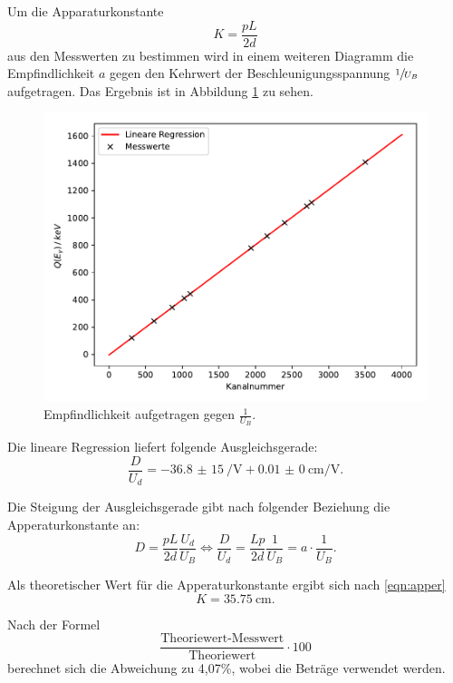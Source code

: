 Um die Apparaturkonstante
\begin{equation}
  K=\frac{pL}{2d}
  \label{eqn:apper}
\end{equation}
aus den Messwerten zu bestimmen wird in einem weiteren Diagramm die Empfindlichkeit $a$
gegen den Kehrwert der Beschleunigungsspannung $\sfrac{1}{U_B}$ aufgetragen. Das Ergebnis
ist in Abbildung \ref{fig:plot3} zu sehen.

\begin{figure}
  \centering
  \includegraphics{plot3.pdf}
  \caption{Empfindlichkeit aufgetragen gegen $\frac{1}{U_B}$.}
  \label{fig:plot3}
\end{figure}

Die lineare Regression liefert folgende Ausgleichsgerade:
\begin{equation}
  \frac{D}{U_d}=\SI{-36,8(15)}{\per\V}+\SI{0,01(0)}{\cm\per\V}.
  \label{eqn:ausgleich}
\end{equation}

Die Steigung der Ausgleichsgerade gibt nach folgender Beziehung die Apperaturkonstante an:
\begin{equation}
  D=\frac{pL}{2d}\frac{U_d}{U_B} \iff \frac{D}{U_d}=\frac{Lp}{2d}\frac{1}{U_B}=a\cdot\frac{1}{U_B}.
\end{equation}

Als theoretischer Wert für die Apperaturkonstante ergibt sich nach \ref{eqn:apper}
\begin{equation*}
  K=\SI{35,75}{\cm}.
\end{equation*}

Nach der Formel
\begin{equation}
  \frac{\text{Theoriewert-Messwert}}{\text{Theoriewert}}\cdot 100
\end{equation}
berechnet sich die Abweichung zu 4,07\%, wobei die Beträge verwendet werden.


